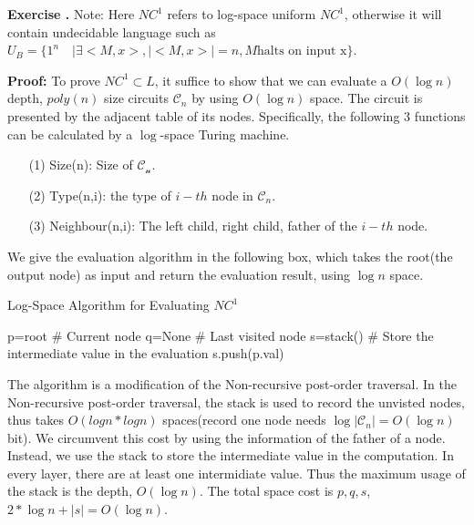 \documentclass[a4paper]{article}
\newenvironment{exercise}[1]{
	\par
	\noindent\textbf{Exercise #1.}\quad
}{
	\par
	\bigskip
}
\begin{document}
\begin{exercise}{6.14}
\textbf{Note:} Here $NC^1$ refers to log-space uniform $NC^1$, otherwise it will contain undecidable language such as $U_B=\{1^n\quad | \exists <M,x>, |<M,x>|=n, M\text{halts on input x}\}$.

\textbf{Proof:} To prove $NC^1\subset L$, it suffice to show that we can evaluate a $O(\log n)$ depth, $poly(n)$ size circuits $\mathcal{C}_n$ by using $O(\log n)$ space. The circuit is presented by the adjacent table of its nodes. Specifically, the following 3 functions can be calculated by a $\log$-space Turing machine.
\begin{itemize}
\item[(1)] Size(n): Size of $\mathcal{C_n}$.
\item[(2)] Type(n,i): the type of $i-th$ node in $\mathcal{C}_n$.
\item[(3)] Neighbour(n,i): The left child, right child, father of the $i-th$ node.
\end{itemize} 
We give the evaluation algorithm in the following box, which takes the root(the output node) as input and return   
the evaluation result, using $\log n$ space. 


\begin{algorithm}[h!]
\caption{Log-Space Algorithm for Evaluating $NC^1$}
p=root \# Current node\;
q=None \# Last visited node\;
s=stack() \# Store the intermediate value in the evaluation\;
s.push(p.val)\;
\end{algorithm}


The algorithm is a modification of the Non-recursive post-order traversal. In the Non-recursive post-order traversal, the stack is used to record the unvisted nodes, thus takes $O(log n*log n)$ spaces(record one node needs $\log |\mathcal{C}_n|=O(\log n)$ bit). We circumvent this cost by using the information of the father of a node. Instead, we use the stack to store the intermediate value in the computation. In every layer, there are at least one intermidiate value. Thus the maximum usage of the stack is the depth, $O(\log n)$. The total space cost is $p,q,s$, $2*\log n+|s|=O(\log n)$.

\end{exercise}
\end{document}
